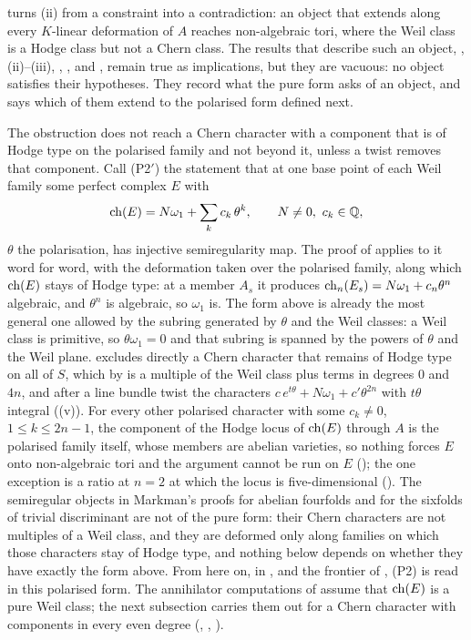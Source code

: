 \begin{remark}\label{rem:p2prime}
 turns (ii) from a constraint into a
contradiction: an object that extends along every $K$-linear deformation of
$A$ reaches non-algebraic tori, where the Weil class is a Hodge class but not
a Chern class. The results that describe such an object,
, (ii)--(iii), ,
,  and , remain true as
implications, but they are vacuous: no object satisfies their hypotheses.
They record what the pure form asks of an object, and
 says which of them extend to the polarised form
defined next.

The obstruction does not reach a Chern character with a component that is of
Hodge type on the polarised family and not beyond it, unless a twist removes
that component. Call
\textup{(P2$'$)} the statement that at one base point of each Weil family
some perfect complex $E$ with
\[
  \operatorname{ch}(E)=N\omega_{1}+\sum_{k}c_{k}\,\theta^{k},\qquad N\ne0,\ c_{k}\in\mathbb{Q},
\]
$\theta$ the polarisation, has injective semiregularity map. The proof of
 applies to it word for word, with the deformation
taken over the polarised family, along which $\operatorname{ch}(E)$ stays of Hodge type:
at a member $A_{s}$ it produces $\operatorname{ch}_{n}(E_{s})=N\omega_{1}+c_{n}\theta^{n}$
algebraic, and $\theta^{n}$ is algebraic, so $\omega_{1}$ is. The form above
is already the most general one allowed by the subring generated by $\theta$
and the Weil classes: a Weil class is primitive, so $\theta\omega_{1}=0$ and
that subring is spanned by the powers of $\theta$ and the Weil plane.
 excludes directly a Chern character that remains of Hodge
type on all of $S$, which by  is a multiple of the
Weil class plus terms in degrees $0$ and $4n$, and after a line bundle twist
the characters $c\,e^{t\theta}+N\omega_{1}+c'\theta^{2n}$ with $t\theta$
integral ((v)). For every other polarised character
with some $c_{k}\ne0$, $1\le k\le2n-1$, the component of the Hodge locus of
$\operatorname{ch}(E)$ through $A$ is the polarised family itself, whose members are
abelian varieties, so nothing forces $E$ onto non-algebraic tori and the
argument cannot be run on $E$ (); the one exception is
a ratio at $n=2$ at which the locus is five-dimensional
(). The semiregular objects in Markman's
proofs for abelian fourfolds and for the sixfolds of trivial discriminant
\cite{Mar25a,Mar25b} are not of the pure form: their Chern characters are not
multiples of a Weil class, and they are deformed only along families on which
those characters stay of Hodge type, and nothing below depends on whether
they have exactly the form above. From here on, in
,  and the frontier of
, \textup{(P2)} is read in this polarised form. The
annihilator computations of  assume that $\operatorname{ch}(E)$ is a
pure Weil class; the next subsection carries them out for a Chern character
with components in every even degree (,
, ).


\end{remark}
